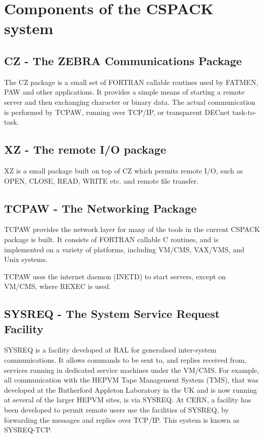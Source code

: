 \section{Components of the CSPACK system}
\subsection{CZ - The ZEBRA Communications Package}
\par
The CZ package is a small set of FORTRAN callable
routines used by FATMEN, PAW
and other applications. It provides a simple means of starting a remote
server and then exchanging character or binary data. The actual
communication is performed by TCPAW, running over TCP/IP, or transparent
DECnet task-to-task.
\subsection{XZ - The remote I/O package}
\par
XZ is a small package built on top of CZ which permits remote I/O,
such as OPEN, CLOSE, READ, WRITE etc. and remote file transfer.
\subsection{TCPAW - The Networking Package}
\par
TCPAW provides the network layer for many of the tools
in the current CSPACK package is built. It consists
of FORTRAN callable C routines, and is implemented on a variety of
platforms, including VM/CMS, VAX/VMS,
and Unix systems.
\par
TCPAW uses the internet daemon (INETD) to start servers,
except on VM/CMS, where REXEC is used.
\subsection{SYSREQ - The System Service Request Facility}
\par
{}
SYSREQ is a facility developed at RAL
for generalised inter-system communications. It allows
commands to be sent to, and replies received from, services running
in dedicated service machines under the VM/CMS.
For example, all communication with the HEPVM Tape Management
System (TMS), that was developed at the Rutherford Appleton
Laboratory in the UK and is now running at several of the
larger HEPVM sites, is via SYSREQ.
At CERN, a facility has
been developed to permit remote users use the facilities of SYSREQ,
by forwarding the messages and replies over TCP/IP. This system is
known as SYSREQ-TCP.
